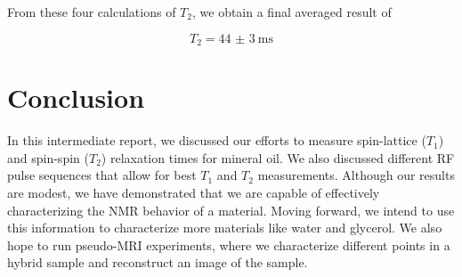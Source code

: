 \documentclass[%
 reprint,
 amsmath,amssymb,
 aps,
]{revtex4-2}
\begin{document}
From these four calculations of $T_2$, we obtain a final averaged result of 

\begin{equation}
    T_2 = \SI[uncertainty-mode=separate]{44(3)}{\milli\second}
\end{equation}


\section{Conclusion}  

In this intermediate report, we discussed our efforts to measure spin-lattice ($T_1$) and spin-spin ($T_2$) relaxation times for mineral oil. We also discussed different RF pulse sequences that allow for best $T_1$ and $T_2$ measurements. Although our results are modest, we have demonstrated that we are capable of effectively characterizing the NMR behavior of a material. Moving forward, we intend to use this information to characterize more materials like water and glycerol. We also hope to run pseudo-MRI experiments, where we characterize different points in a hybrid sample and reconstruct an image of the sample. 






\nocite{*}


\end{document}
